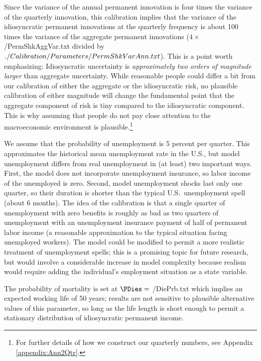\documentclass[titlepage]{\econtex}\newcommand{\texname}{cAndCwithStickyE}
\begin{document}
Since the variance of the annual permanent innovation is four times the variance of the quarterly innovation, this calibration implies that the variance of the idiosyncratic permanent innovations at the quarterly frequency is about 100 times the variance of the aggregate permanent innovations ($4 \times $ \ParmDir/PermShkAggVar.txt divided by $ ./Calibration/Parameters/PermShkVarAnn.txt $).  This is a point worth emphasizing: Idiosyncratic uncertainty is {\it approximately two orders of magnitude larger} than aggregate uncertainty.  While reasonable people could differ a bit from our calibration of either the aggregate or the idiosyncratic risk, no plausible calibration of either magnitude will change the fundamental point that the aggregate component of risk is tiny compared to the idiosyncratic component.  This is why assuming that people do not pay close attention to the macroeconomic environment is plausible.\footnote{For further details of how we construct our quarterly numbers, see Appendix \ref{appendix:Ann2Qtr}.}

We assume that the probability of unemployment is 5 percent per quarter.  This approximates the historical mean unemployment rate in the U.S., but model unemployment differs from real unemployment in (at least) two important ways.  First, the model does not incorporate unemployment insurance, so labor income of the unemployed is zero.  Second, model unemployment shocks last only one quarter, so their duration is shorter than the typical U.S.\ unemployment spell (about 6 months).  The idea of the calibration is that a single quarter of unemployment with zero benefits is roughly as bad as two quarters of unemployment with an unemployment insurance payment of half of permanent labor income (a reasonable approximation to the typical situation facing unemployed workers).  The model could be modified to permit a more realistic treatment of unemployment spells; this is a promising topic for future research, but would involve a considerable increase in model complexity because realism would require adding the individual's employment situation as a state variable.

The probability of mortality is set at $\PDies=$  {\ParmDir/DiePrb.txt} which implies an expected working life of 50 years; results are not sensitive to plausible alternative values of this parameter, so long as the life length is short enough to permit a stationary distribution of idiosyncratic permanent income.
\end{document}
